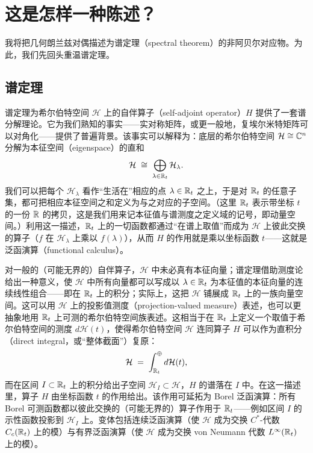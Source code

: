 \section{这是怎样一种陈述？}\label{sec:1}

我将把几何朗兰兹对偶描述为谱定理（spectral theorem）的非阿贝尔对应物。为此，我们先回头重温谱定理。

\subsection{谱定理}\label{sec:1.1}

谱定理为希尔伯特空间 $\mathcal{H}$ 上的自伴算子（self-adjoint operator）$H$ 提供了一套谱分解理论。它为我们熟知的事实——实对称矩阵，或更一般地，复埃尔米特矩阵可以对角化——提供了普遍背景。该事实可以解释为：底层的希尔伯特空间 $\mathcal{H}\cong\mathbb{C}^{n}$ 分解为本征空间（eigenspace）的直和
\begin{equation}\label{eq:1.1}
\mathcal{H}\;\cong\;\bigoplus_{\lambda\in\mathbb{R}_{t}}\mathcal{H}_{\lambda}.
\end{equation}
我们可以把每个 $\mathcal{H}_{\lambda}$ 看作“生活在”相应的点 $\lambda\in\mathbb{R}_{t}$ 之上，于是对 $\mathbb{R}_{t}$ 的任意子集，都可把相应本征空间之和定义为与之对应的子空间。（这里 $\mathbb{R}_{t}$ 表示带坐标 $t$ 的一份 $\mathbb{R}$ 的拷贝，这是我们用来记本征值与谱测度之定义域的记号，即动量空间。）利用这一描述，$\mathbb{R}_{t}$ 上的一切函数都通过“在谱上取值”而成为 $\mathcal{H}$ 上彼此交换的算子（$f$ 在 $\mathcal{H}_{\lambda}$ 上乘以 $f(\lambda)$），从而 $H$ 的作用就是乘以坐标函数 $t$——这就是泛函演算（functional calculus）。

对一般的（可能无界的）自伴算子，$\mathcal{H}$ 中未必真有本征向量；谱定理借助测度论给出一种意义，使 $\mathcal{H}$ 中所有向量都可以写成以 $\lambda\in\mathbb{R}_{t}$ 为本征值的本征向量的连续线性组合——即在 $\mathbb{R}_{t}$ 上的积分；实际上，这把 $\mathcal{H}$ 铺展成 $\mathbb{R}_{t}$ 上的一族向量空间。这可以用 $\mathcal{H}$ 上的投影值测度（projection-valued measure）表述，也可以更抽象地用 $\mathbb{R}_{t}$ 上可测的希尔伯特空间族表述。这相当于在 $\mathbb{R}_{t}$ 上定义一个取值于希尔伯特空间的测度 $d\mathcal{H}(t)$，使得希尔伯特空间 $\mathcal{H}$ 连同算子 $H$ 可以作为直积分（direct integral，或“整体截面”）复原：
\begin{equation}\label{eq:1.2}
\mathcal{H}\;=\;\int^{\oplus}_{\mathbb{R}_{t}} d\mathcal{H}(t),
\end{equation}
而在区间 $I\subset\mathbb{R}_{t}$ 上的积分给出子空间 $\mathcal{H}_{I}\subset\mathcal{H}$，$H$ 的谱落在 $I$ 中。在这一描述里，算子 $H$ 由坐标函数 $t$ 的作用给出。该作用可延拓为 Borel 泛函演算：所有 Borel 可测函数都以彼此交换的（可能无界的）算子作用于 $\mathbb{R}_{t}$——例如区间 $I$ 的示性函数投影到 $\mathcal{H}_{I}$ 上。变体包括连续泛函演算（使 $\mathcal{H}$ 成为交换 $C^{*}$-代数 $C_{c}(\mathbb{R}_{t})$ 上的模）与有界泛函演算（使 $\mathcal{H}$ 成为交换 von Neumann 代数 $L^{\infty}(\mathbb{R}_{t})$ 上的模）。


